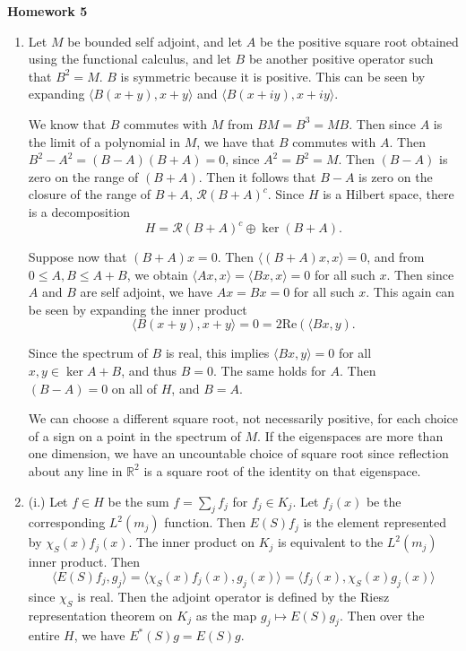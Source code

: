 \documentclass[11pt, reqno]{article}
\theoremstyle{plain}
\theoremstyle{definition}
\theoremstyle{remark}
\newcommand{\RR}{\mathbb{R}}
\begin{document}
\topmargin=-40pt
\renewcommand{\headrulewidth}{1pt}
\renewcommand{\headsep}{20pt}
\thispagestyle{fancy}

{\Huge \bfseries \noindent Homework 5}

\begin{enumerate}
    \item[2.] Let $M$ be bounded self adjoint, and let $A$ be the positive square root obtained using the functional calculus, and let 
    $B$ be another positive operator such that $B^2 = M$. $B$ is symmetric because it is positive.
    This can be seen by expanding $\langle B(x + y), x + y\rangle$ and $\langle B(x + iy), x + iy\rangle$.

    We know that $B$ commutes with $M$ from $BM = B^3 = MB$. Then since $A$ is the limit of a polynomial in $M$,
    we have that $B$ commutes with $A$. Then $B^2 - A^2 = (B - A)(B + A) = 0$, since $A^2 = B^2 = M$. Then
    $(B - A)$ is zero on the range of $(B + A)$. Then it follows that $B-A$ is zero on the closure of the range 
    of $B + A$, $\mathcal{R}(B + A)^c$. Since $H$ is a Hilbert space, there is a decomposition 
    \[
        H = \mathcal{R}(B + A)^c \oplus \ker(B + A).
    \]

    Suppose now that $(B + A)x = 0$. Then $\langle (B + A)x, x\rangle = 0$, and from $0 \leq A, B \leq A + B$,
    we obtain $\langle Ax, x\rangle = \langle Bx, x\rangle = 0$ for all such $x$. Then since $A$ and $B$
    are self adjoint, we have $Ax = Bx = 0$ for all such $x$. This again can be seen by expanding 
    the inner product 
    \[
        \langle B(x + y), x + y\rangle = 0 = 2\text{Re}(\langle Bx, y).
    \]

    Since the spectrum of $B$ is real, this implies $\langle Bx, y\rangle = 0$ for all $x, y \in \ker{A + B}$,
    and thus $B = 0$. The same holds for $A$. Then $(B - A) = 0$ on all of $H$, and $B = A$. 

    We can choose a different square root, not necessarily positive, for each choice of a sign on a point in
    the spectrum of $M$. If the eigenspaces are more than one dimension, we have an uncountable
    choice of square root since reflection about any line in $\RR^2$ is a square root of the identity on
    that eigenspace. 

    \item[5.] (i.) Let $f \in H$ be the sum $f = \sum_{j} f_j$ for $f_j \in K_j$. Let $f_j(x)$ be the corresponding
    $L^2(m_j)$ function. Then $E(S)f_j$ is the element represented by $\chi_S(x)f_j(x)$. The inner product
    on $K_j$ is equivalent to the $L^2(m_j)$ inner product. Then 
    \[
        \langle E(S)f_j, g_j\rangle = \langle \chi_S(x) f_j(x), g_j(x)\rangle = \langle f_j(x), \chi_S(x)g_j(x)\rangle
    \]
    since $\chi_S$ is real. Then the adjoint operator is defined by the Riesz representation theorem on $K_j$ as 
    the map $g_j \mapsto E(S)g_j$. Then over the entire $H$, we have $E^*(S)g = E(S)g$.


\end{enumerate}
\end{document}
